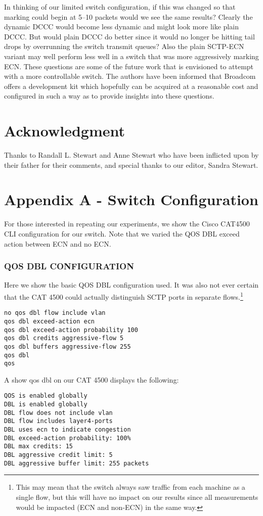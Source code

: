 \documentclass[12pt]{article}
\begin{document}
In thinking of our limited switch configuration, if this was changed so that marking could begin at 5--10 packets
would we see the same results? Clearly the dynamic DCCC would become less dynamic and might look more
like plain DCCC. But would plain DCCC do better since it would no longer be hitting tail drops 
by overrunning the switch transmit queues? Also the plain SCTP-ECN variant may well perform less well 
in a switch that was more aggressively marking ECN. These questions are some of the future work that
is envisioned to attempt with a more controllable switch. The authors have been informed that Broadcom
offers a development kit which hopefully can be acquired at a reasonable cost and configured in such
a way as to provide insights into these questions.
     

\section*{Acknowledgment}

Thanks to  Randall L. Stewart and Anne Stewart who have been inflicted upon by their father for their comments, and special thanks to our editor,  Sandra Stewart.

\section*{Appendix A - Switch Configuration}

For those interested in repeating our experiments, we show the Cisco CAT4500 CLI
configuration for our switch.  Note that we varied the QOS DBL exceed action between
ECN and no ECN.

\subsubsection{QOS DBL CONFIGURATION}
 
Here we show the basic QOS DBL configuration used. It was
also not ever certain that the CAT 4500 could actually distinguish SCTP ports in separate flows.\footnote{This
may mean that the switch always saw traffic from each machine as a single flow, but this will have no impact on
our results since all measurements would be impacted (ECN and non-ECN) in the same way.}
\begin{verbatim}
no qos dbl flow include vlan
qos dbl exceed-action ecn
qos dbl exceed-action probability 100
qos dbl credits aggressive-flow 5
qos dbl buffers aggressive-flow 255
qos dbl   
qos
\end{verbatim}
A show qos dbl on our CAT 4500 displays the following:
\begin{verbatim}
QOS is enabled globally
DBL is enabled globally
DBL flow does not include vlan
DBL flow includes layer4-ports
DBL uses ecn to indicate congestion
DBL exceed-action probability: 100%
DBL max credits: 15
DBL aggressive credit limit: 5
DBL aggressive buffer limit: 255 packets
\end{verbatim}
\end{document}
